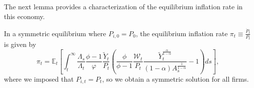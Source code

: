 The next lemma provides a characterization of the equilibrium inflation rate in this economy. 

\begin{lemma}
    In a symmetric equilibrium where $P_{i,0} = P_0$, the equilibrium inflation rate $\pi_t \equiv \frac{\dot{P}_t}{P_t}$ is given by
    \begin{equation}\label{eq:inflation_rate}
        \pi_{t} = \mathbb{E}_t\left[ \int_t^\infty \frac{\Lambda_s}{\Lambda_t} \frac{\phi-1}{\varphi}\frac{\tilde{Y}_{t}}{P_t} \left( \frac{\phi}{\phi-1} \frac{\mathcal{W}_{t}}{P_{t}} \frac{\tilde{Y}_{t}^{\frac{\alpha}{1-\alpha}}}{(1-\alpha) A_s^{\frac{1}{1-\alpha}}}-1\right) ds\right],
    \end{equation}
    where we imposed that $P_{i,t} = P_t$, so we obtain a symmetric solution for all firms.
\end{lemma}

